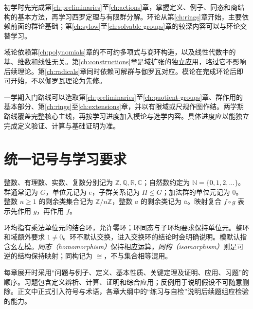 初学时先完成第\ref{ch:preliminaries}至\ref{ch:actions}章，掌握定义、例子、同态和商结构的基本方法，再学习西罗定理与有限群分解。环论从第\ref{ch:rings}章开始，主要依赖前面的群论基础；第\ref{ch:sylow}至\ref{ch:solvable-groups}章的较深内容可以与环论交替学习。

域论依赖第\ref{ch:polynomials}章的不可约多项式与商环构造，以及线性代数中的基、维数和线性无关。第\ref{ch:constructions}章是域扩张的独立应用，略过它不影响后续理论。第\ref{ch:radicals}章同时依赖可解群与伽罗瓦对应。模论在完成环论后即可开始，不以伽罗瓦理论为先修。

一学期入门路线可以选取第\ref{ch:preliminaries}至\ref{ch:quotient-groups}章、群作用的基本部分、第\ref{ch:rings}至\ref{ch:extensions}章，并以有限域或尺规作图作结。两学期路线覆盖完整核心主线，再按学习进度加入模论与选学内容。具体进度应以能独立完成定义验证、计算与基础证明为准。

\section{统一记号与学习要求}

整数、有理数、实数、复数分别记为 $\mathbb Z,\mathbb Q,\mathbb R,\mathbb C$；自然数约定为 $\mathbb N=\{0,1,2,\ldots\}$。群通常记为 $G$，单位元记为 $e$，子群关系记为 $H\leq G$；加法群的单位元记为 $0$。整数 $n\geq 1$ 的剩余类集合记为 $\mathbb Z/n\mathbb Z$，整数 $a$ 的剩余类记为 $\overline a$。映射复合 $f\circ g$ 表示先作用 $g$，再作用 $f$。

环均指有乘法单位元的结合环，允许零环；环同态与子环均要求保持单位元。整环和域额外要求 $1\ne0$。环不默认交换，进入交换环的结论时会明确说明。模默认指含幺左模。\emph{同态（homomorphism）}保持相应运算，\emph{同构（isomorphism）}则是可逆的结构保持映射；同构记为 $\cong$，不与集合相等混用。

每章展开时采用“问题与例子、定义、基本性质、关键定理及证明、应用、习题”的顺序。习题包含定义辨析、计算、证明和综合应用；反例用于说明假设不可随意删除。正文中正式引入符号与术语，各章大纲中的“练习与自检”说明后续题组应检验的能力。

